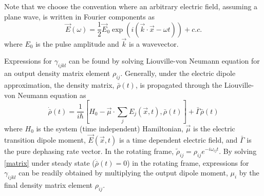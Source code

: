 \documentclass[aip, jcp, reprint, twocolumn]{revtex4-2}
\begin{document}
Note that we choose the convention where an arbitrary electric field, assuming a plane wave, is written in Fourier components as 
\begin{equation}
	\vec{E}(\omega) = \frac{1}{2} \vec{E}_0 \exp(i(\vec{k}\cdot\vec{x} - \omega t)) + c.c.
\end{equation}
where $E_0$ is the pulse amplitude and $\vec{k}$ is a wavevector.


Expressions for $\gamma_{ijkl}$ can be found by solving Liouville-von Neumann equation for an output density matrix element $\rho_{ij}$.
Generally, under the electric dipole approximation, the density matrix, $\bar{\rho}(t)$, is propagated through the Liouville-von Neumann equation as \cite{RN455}
\begin{equation}\label{matrix}
	\dot{\bar{\rho}}(t) = \frac{1}{i \hbar}[H_0 - \vec{\mu}\cdot \sum_j E_j(\vec{x},t), \bar{\rho}(t)] + \bar{\Gamma} \bar{\rho}(t)
\end{equation} %
where $H_0$ is the system (time independent) Hamiltonian, $\vec{\mu}$ is the electric transition dipole moment, $\vec{E}(\vec{x},t)$ is a time dependent electric field, and $\bar{\Gamma}$ is the pure dephasing rate vector. 
In the rotating frame, $\tilde{\rho}_{ij} = \rho_{ij} e^{-i \omega_{ij}t}$.
By solving \autoref{matrix} under steady state ($\dot{\bar{\rho}}(t) = 0$) in the rotating frame, expressions for $\gamma_{ijkl}$ can be readily obtained by multiplying the output dipole moment, $\mu_i$ by the final density matrix element $\rho_{ij}$. 
\end{document}

